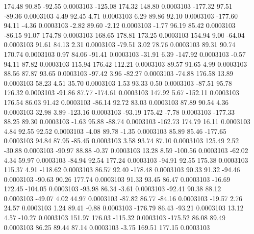       174.48       90.85      -92.55     0.0003103
     -125.08      174.32      148.80     0.0003103
     -177.32       97.51      -89.36     0.0003103
        4.49       92.45        4.71     0.0003103
        6.29       89.86       92.10     0.0003103
     -177.60       94.11       -4.36     0.0003103
       -2.82       89.60       -2.12     0.0003103
       -1.77       96.19       85.42     0.0003103
      -86.15       91.07      174.78     0.0003103
      168.65      178.81      173.25     0.0003103
      154.94        9.00      -64.04     0.0003103
       91.61       84.13        2.31     0.0003103
      -79.51        3.02       78.76     0.0003103
       89.31       90.74      170.74     0.0003103
        0.97       84.06      -91.41     0.0003103
      -31.91        6.39     -147.92     0.0003103
       -0.57       94.11       87.82     0.0003103
      115.94      176.42      112.21     0.0003103
       89.57       91.65        4.99     0.0003103
       88.56       87.87       93.65     0.0003103
      -97.42        3.96      -82.27     0.0003103
      -74.88      176.58       13.89     0.0003103
       58.23        4.51       35.70     0.0003103
        1.53       93.33        0.50     0.0003103
      -87.51       95.78      176.32     0.0003103
      -91.86       87.77     -174.61     0.0003103
      147.92        5.67     -152.11     0.0003103
      176.54       86.03       91.42     0.0003103
      -86.14       92.72       83.03     0.0003103
       87.89       90.54        4.36     0.0003103
       32.98        3.89     -123.16     0.0003103
      -93.19      175.42       -7.78     0.0003103
     -177.33       88.25       89.30     0.0003103
       -1.63       95.88      -88.74     0.0003103
     -162.73      174.79       16.11     0.0003103
        4.84       92.55       92.52     0.0003103
       -4.08       89.78       -1.35     0.0003103
       85.89       85.46     -177.65     0.0003103
       94.84       87.95      -85.45     0.0003103
        3.58       93.74       87.10     0.0003103
      125.49        2.52      -30.88     0.0003103
      -90.97       88.88       -0.37     0.0003103
       13.28        8.59     -100.56     0.0003103
      -62.02        4.34       59.97     0.0003103
      -84.94       92.54      177.24     0.0003103
      -94.91       92.55      175.38     0.0003103
      115.37        4.91     -118.62     0.0003103
       86.57       92.40     -178.48     0.0003103
       90.33       91.32      -94.46     0.0003103
      -90.63       90.26      177.74     0.0003103
       91.33       93.45       86.47     0.0003103
      -16.69      172.45     -104.05     0.0003103
      -93.98       86.34       -3.61     0.0003103
      -92.41       90.38       88.12     0.0003103
      -49.07        4.02       44.97     0.0003103
      -87.82       86.77      -84.16     0.0003103
      -19.57        2.76       24.57     0.0003103
        1.24       89.41       -0.88     0.0003103
     -176.79       86.43      -93.21     0.0003103
       13.12        4.57      -10.27     0.0003103
      151.97      176.03     -115.32     0.0003103
     -175.52       86.08       89.49     0.0003103
       86.25       89.44       87.14     0.0003103
       -3.75      169.51      177.15     0.0003103
